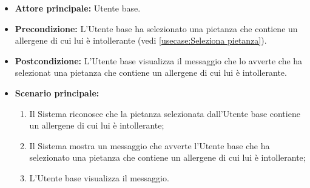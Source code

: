 \label{usecase:Visualizzazione messaggio di selezione di una pietanza con allergene}
\begin{itemize}
	\item \textbf{Attore principale:} Utente base.

	\item \textbf{Precondizione:}
	      L'Utente base ha selezionato una pietanza che contiene un allergene di cui lui è intollerante (vedi \autoref{usecase:Seleziona pietanza}).

	\item \textbf{Postcondizione:}
	      L'Utente base visualizza il messaggio che lo avverte che ha selezionat una pietanza che contiene un allergene di cui lui è intollerante.

	\item \textbf{Scenario principale:}
	      \begin{enumerate}
		      \item Il Sistema riconosce che la pietanza selezionata dall'Utente base contiene un allergene di cui lui è intollerante;
		      \item Il Sistema mostra un messaggio che avverte l'Utente base che ha selezionato una pietanza che contiene un allergene di cui lui è intollerante;
		      \item L'Utente base visualizza il messaggio.
	      \end{enumerate}
\end{itemize}
